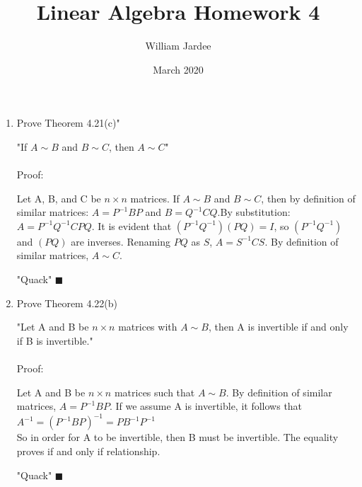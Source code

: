 \documentclass{article}
\title{Linear Algebra Homework 4}
\author{William Jardee}
\date{March 2020}
\newcommand\tab[1][1cm]{\hspace*{#1}}
\begin{document}
\maketitle

\begin{enumerate}
    \item 
\tab Prove Theorem 4.21(c)"\par
"If $A \sim B$ and $B \sim C$, then $A \sim C$"\\\\
Proof:\par
Let A, B, and C be $n \times n$ matrices. If $A \sim B$ and $B \sim C$, then by definition of similar matrices: $A = P^{-1} B P$ and $B = Q^{-1} C Q$.By substitution: $A = P^{-1}Q^{-1}CPQ$. It is evident that $(P^{-1}Q^{-1})(PQ) = I$, so $(P^{-1}Q^{-1})$ and $(PQ)$ are inverses. Renaming $PQ$ as $S$, $A = S^{-1}CS$. By definition of similar matrices, $A \sim C$.\par
{\raggedleft "Quack"  $\blacksquare$\\}

\item
\tab Prove Theorem 4.22(b)\par
"Let A and B be $n \times n$ matrices with $A \sim B$, then A is invertible if and only if B is invertible."\\\\
Proof:\par
Let A and B be $n \times n$ matrices such that $A \sim B$. By definition of similar matrices, $A = P^{-1}BP$. If we assume A is invertible, it follows that\\
\tab $A^{-1} = (P^{-1}BP)^{-1} = PB^{-1}P^{-1}$\\
So in order for A to be invertible, then B must be invertible. The equality proves if and only if relationship.\par
{\raggedleft "Quack"  $\blacksquare$\\}


\end{enumerate}
\end{document}
